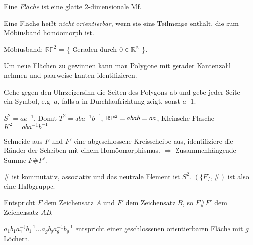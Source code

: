 \begin{defi}[Fläche]
Eine \emph{Fläche} ist eine glatte 2-dimensionale Mf.
\end{defi}


\begin{defi}[Orientierbarkeit]
Eine Fläche heißt \emph{nicht orientierbar}, wenn sie eine Teilmenge enthält, die zum Möbiusband homöomorph ist.
\end{defi}

\begin{bsp}
Möbiusband; $\mathbb{RP}^2$ = \{ Geraden durch $0 \in \mathbb R^3$ \}.
\end{bsp}

\begin{bem}
	Um neue Flächen zu gewinnen kann man Polygone mit gerader Kantenzahl nehmen und 
	paarweise kanten identifizieren.
\end{bem}

\begin{bem}
	Gehe gegen den Uhrzeigersinn die Seiten des Polygons ab und gebe jeder Seite
	ein Symbol, e.g. $a$, falls a in Durchlaufrichtung zeigt, sonst $a^-1$.
\end{bem}

\begin{bsp}
	$S^2 = aa^{-1}$, 
	Donut $T^2 = aba^{-1}b^{-1}$, 
	$\mathbb R\mathbb{P}^2 = abab = aa$,
	Kleinsche Flasche $K^2 = aba^{-1}b^{-1}$
\end{bsp}

\begin{defi}
	Schneide aus $F$ und $F'$ eine abgeschlossene Kreisscheibe aus, 
	identifiziere die Ränder der Scheiben mit einem Homöomorphismus. 
	$\Rightarrow$ Zusammenhängende Summe $F\#F'$.
\end{defi}

\begin{bem}
	$\#$ ist kommutativ, assoziativ und das neutrale Element ist $S^2$. 
	$(\{F\}, \#)$ ist also eine Halbgruppe.
\end{bem}

\begin{bem}
	Entspricht $F$ dem Zeichensatz $A$ und $F'$ dem Zeichensatz $B$,
	so $F\#F'$ dem Zeichensatz $AB$.
\end{bem}

\begin{bsp}
	$a_1 b_1 a_1^{-1} b_1^{-1}\dots a_g b_g a_g^{-1} b_g^{-1}$
	entspricht einer geschlossenen orientierbaren Fläche mit $g$ Löchern.
\end{bsp}

